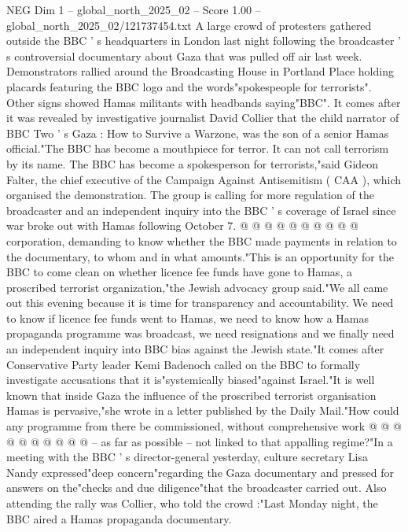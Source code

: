 \begin{textsample}{NEG Dim 1 – global\_north\_2025\_02 – Score 1.00 – global\_north\_2025\_02/121737454.txt}  \label{ex:f1_neg_011}
A large crowd of protesters gathered outside the BBC ' s headquarters in London last night following the broadcaster ' s controversial documentary about Gaza that was pulled off air last week.
Demonstrators rallied around the Broadcasting House in Portland Place holding placards featuring the BBC logo and the words"spokespeople for terrorists".
Other signs showed Hamas militants with headbands saying"BBC".
It comes after it was revealed by investigative journalist David Collier that the child narrator of BBC Two ' s Gaza : How to Survive a Warzone, was the son of a senior Hamas official."The BBC has become a mouthpiece for terror.
It can not call terrorism by its name.
The BBC has become a spokesperson for terrorists,"said Gideon Falter, the chief executive of the Campaign Against Antisemitism ( CAA ), which organised the demonstration.
The group is calling for more regulation of the broadcaster and an independent inquiry into the BBC ' s coverage of Israel since war broke out with Hamas following October 7. @ @ @ @ @ @ @ @ @ @ corporation, demanding to know whether the BBC made payments in relation to the documentary, to whom and in what amounts."This is an opportunity for the BBC to come clean on whether licence fee funds have gone to Hamas, a proscribed terrorist organization,"the Jewish advocacy group said."We all came out this evening because it is time for transparency and accountability.
We need to know if licence fee funds went to Hamas, we need to know how a Hamas propaganda programme was broadcast, we need resignations and we finally need an independent inquiry into BBC bias against the Jewish state."It comes after Conservative Party leader Kemi Badenoch called on the BBC to formally investigate accusations that it is"systemically biased"against Israel."It is well known that inside Gaza the influence of the proscribed terrorist organisation Hamas is pervasive,"she wrote in a letter published by the Daily Mail."How could any programme from there be commissioned, without comprehensive work @ @ @ @ @ @ @ @ @ @ -- as far as possible -- not linked to that appalling regime?"In a meeting with the BBC ' s director-general yesterday, culture secretary Lisa Nandy expressed"deep concern"regarding the Gaza documentary and pressed for answers on the"checks and due diligence"that the broadcaster carried out.
Also attending the rally was Collier, who told the crowd :"Last Monday night, the BBC aired a Hamas propaganda documentary.

\end{textsample}
